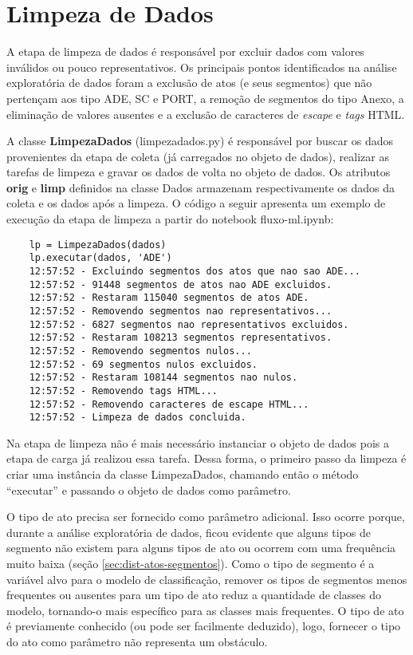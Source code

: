 \section{Limpeza de Dados}

A etapa de limpeza de dados é responsável por excluir dados com valores inválidos ou pouco representativos. Os principais pontos identificados na análise exploratória de dados foram a exclusão de atos (e seus segmentos) que não pertençam aos tipo ADE, SC e PORT, a remoção de segmentos do tipo Anexo, a eliminação de valores ausentes e a exclusão de caracteres de \textit{escape} e \textit{tags} HTML.

A classe \textbf{LimpezaDados} (limpeza\textunderscore dados.py) é responsável por buscar os dados provenientes da etapa de coleta (já carregados no objeto de dados), realizar as tarefas de limpeza e gravar os dados de volta no objeto de dados. Os atributos \textbf{orig} e \textbf{limp} definidos na classe Dados armazenam  respectivamente os dados da coleta e os dados após a limpeza. O código a seguir apresenta um exemplo de execução da etapa de limpeza a partir do notebook fluxo-ml.ipynb:

\begin{lstlisting}
	lp = LimpezaDados(dados)
	lp.executar(dados, 'ADE')
	12:57:52 - Excluindo segmentos dos atos que nao sao ADE...
	12:57:52 - 91448 segmentos de atos nao ADE excluidos.
	12:57:52 - Restaram 115040 segmentos de atos ADE.
	12:57:52 - Removendo segmentos nao representativos...
	12:57:52 - 6827 segmentos nao representativos excluidos.
	12:57:52 - Restaram 108213 segmentos representativos.
	12:57:52 - Removendo segmentos nulos...
	12:57:52 - 69 segmentos nulos excluidos.
	12:57:52 - Restaram 108144 segmentos nao nulos.
	12:57:52 - Removendo tags HTML...
	12:57:52 - Removendo caracteres de escape HTML...
	12:57:52 - Limpeza de dados concluida.
\end{lstlisting}

Na etapa de limpeza não é mais necessário instanciar o objeto de dados pois a etapa de carga já realizou essa tarefa. Dessa forma, o primeiro passo da limpeza é criar uma instância da classe LimpezaDados, chamando então o método ``executar'' e passando o objeto de dados como parâmetro. 

O tipo de ato precisa ser fornecido como parâmetro adicional. Isso ocorre porque, durante a análise exploratória de dados, ficou evidente que alguns tipos de segmento não existem para alguns tipos de ato ou ocorrem com uma frequência muito baixa (seção \ref{sec:dist-atos-segmentos}). Como o tipo de segmento é a variável alvo para o modelo de classificação, remover os tipos de segmentos menos frequentes ou ausentes para um tipo de ato reduz a quantidade de classes do modelo, tornando-o mais específico para as classes mais frequentes. O tipo de ato é previamente conhecido (ou pode ser facilmente deduzido), logo, fornecer o tipo do ato como parâmetro não representa um obstáculo. 

